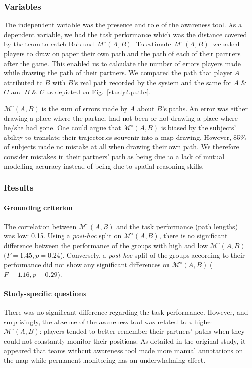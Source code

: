 \documentclass[natbib]{svjour3}
\newcommand{\gModel}[2]{{$\mathcal{M}^{\circ}(#1, #2)$}}
\begin{document}
\subsubsection*{Variables}

The independent variable was the presence and role of the awareness tool. As a
dependent variable, we had the task performance which was the distance covered
by the team to catch Bob and \gModel{A}{B}. To estimate \gModel{A}{B}, we asked
players to draw on paper their own path and the path of each of their partners
after the game. This enabled us to calculate the number of errors players made
while drawing the path of their partners. We compared the path that player $A$
attributed to $B$ with $B$'s real path recorded by the system and the same for
$A$ \& $C$ and $B$ \& $C$ as depicted on Fig.~\ref{study2:paths}. 

\gModel{A}{B} is the sum of errors made by $A$ about $B$'s paths. An error was
either drawing a place where the partner had not been or not drawing a place
where he/she had gone. One could argue that \gModel{A}{B} is biased by the
subjects' ability to translate their trajectories souvenir into a map drawing.
However, 85\% of subjects made no mistake at all when drawing their own path. We
therefore consider mistakes in their partners' path as being due to a lack of
mutual modelling accuracy instead of being due to spatial reasoning skills.

\subsubsection*{Results}

\paragraph{Grounding criterion} The correlation between \gModel{A}{B} and the
task performance (path lengths) was low: 0.15. Using a \emph{post-hoc} split on
\gModel{A}{B}, there is no significant difference between the performance of the
groups with high and low \gModel{A}{B}  ($F = 1.45, p = 0.24$). Conversely, a
\emph{post-hoc} split of the groups according to their performance did not show
any significant differences on \gModel{A}{B} ($F = 1.16, p = 0.29$).

\paragraph{Study-specific questions} There was no significant difference
regarding the task performance. However, and surprisingly, the absence of the
awareness tool was related to a higher \gModel{A}{B}: players tended to better
remember their partners' paths when they could not constantly monitor their
positions. As detailed in the original study, it
appeared that teams without awareness tool made more manual annotations on the
map while permanent monitoring has an underwhelming effect.
\end{document}
